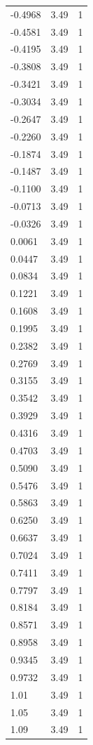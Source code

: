 \begin{longtable}{lrr}
  -0.4968 & 3.49 & 1 \\
  -0.4581 & 3.49 & 1 \\
  -0.4195 & 3.49 & 1 \\
  -0.3808 & 3.49 & 1 \\
  -0.3421 & 3.49 & 1 \\
  -0.3034 & 3.49 & 1 \\
  -0.2647 & 3.49 & 1 \\
  -0.2260 & 3.49 & 1 \\
  -0.1874 & 3.49 & 1 \\
  -0.1487 & 3.49 & 1 \\
  -0.1100 & 3.49 & 1 \\
  -0.0713 & 3.49 & 1 \\
  -0.0326 & 3.49 & 1 \\
  0.0061 & 3.49 & 1 \\
  0.0447 & 3.49 & 1 \\
  0.0834 & 3.49 & 1 \\
  0.1221 & 3.49 & 1 \\
  0.1608 & 3.49 & 1 \\
  0.1995 & 3.49 & 1 \\
  0.2382 & 3.49 & 1 \\
  0.2769 & 3.49 & 1 \\
  0.3155 & 3.49 & 1 \\
  0.3542 & 3.49 & 1 \\
  0.3929 & 3.49 & 1 \\
  0.4316 & 3.49 & 1 \\
  0.4703 & 3.49 & 1 \\
  0.5090 & 3.49 & 1 \\
  0.5476 & 3.49 & 1 \\
  0.5863 & 3.49 & 1 \\
  0.6250 & 3.49 & 1 \\
  0.6637 & 3.49 & 1 \\
  0.7024 & 3.49 & 1 \\
  0.7411 & 3.49 & 1 \\
  0.7797 & 3.49 & 1 \\
  0.8184 & 3.49 & 1 \\
  0.8571 & 3.49 & 1 \\
  0.8958 & 3.49 & 1 \\
  0.9345 & 3.49 & 1 \\
  0.9732 & 3.49 & 1 \\
  1.01 & 3.49 & 1 \\
  1.05 & 3.49 & 1 \\
  1.09 & 3.49 & 1 \\

\end{longtable}
